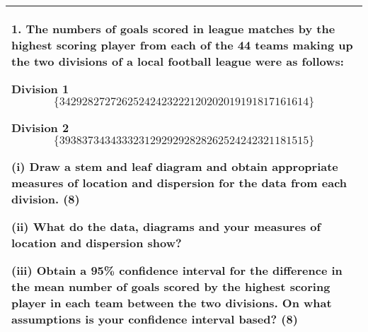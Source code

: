 \documentclass[a4paper,12pt]{article}
\begin{document}

\begin{table}[ht!]
     

\centering
     

\begin{tabular}{|p{15cm}|}
     

\hline 



1. The numbers of goals scored in league matches by the highest scoring player from each of the 44 teams making up the two divisions of a local football league were as follows: 
 
Division 1 
\[\{34  29  28  27  27  26  25  24  24  23  22  21  20  20  20  19  19  18  17  16  16  14 \}\]
 
Division 2 
\[\{39  38  37  34  34  33  32  31  29  29  29  28  28  26  25  24  24  23  21  18  15  15 \}\]
 
(i) Draw a stem and leaf diagram and obtain appropriate measures of location and dispersion for the data from each division. (8) 
 
(ii) What do the data, diagrams and your measures of location and dispersion show? 
 
(iii) Obtain a 95\% confidence interval for the difference in the mean number of goals scored by the highest scoring player in each team between the two divisions.  On what assumptions is your confidence interval based? (8) 
 
\\ \hline


\end{tabular}
    

\end{table}
\end{document}
